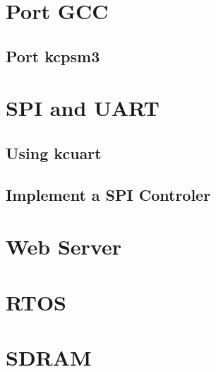\documentclass[a4paper]{book}
\begin{document}
\begin{CJK*}{UTF8}{song}
\part{Port GCC}

\chapter{Port kcpsm3}

\part{SPI and UART}
\chapter{Using kcuart}
\chapter{Implement a SPI Controler}

\part{Web Server}

\part{RTOS}

\part{SDRAM}


\end{CJK*} 
\end{document}
